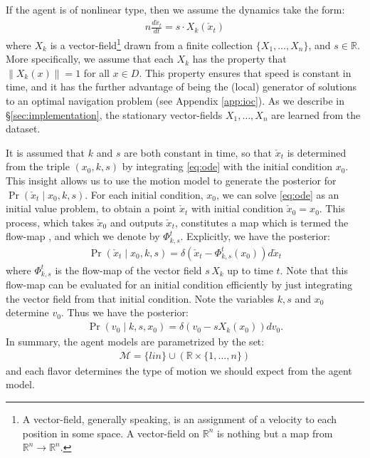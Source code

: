\documentclass[letterpaper,10pt,conference]{ieeeconf}
\begin{document}
If the agent is of nonlinear type, then we assume the dynamics take the form:
\begin{align}n
	\frac{d \check{x}_t}{dt} = s \cdot X_k(\check{x}_t) \label{eq:ode}
\end{align}
where $X_k$ is a vector-field\footnote{A vector-field, generally speaking, is an assignment of a velocity to each position in some space.  A vector-field on $\mathbb{R}^n$ is nothing but a map from $\mathbb{R}^n \to \mathbb{R}^n$.} drawn from a finite collection $\{X_1, \dots, X_n\}$, and $s \in \mathbb{R}$.
More specifically, we assume that each $X_k$ has the property that $\| X_k(x) \| = 1$ for all $x \in D$.
This property ensures that speed is constant in time, and it has the further advantage of being the (local) generator
of solutions to an optimal navigation problem (see Appendix \ref{app:ioc}).
As we describe in \S \ref{sec:implementation}, the stationary vector-fields $X_1,\dots,X_n$ are learned from the dataset.

It is assumed that $k$ and $s$ are both constant in time, so that $\check{x}_t$ is determined from the triple $(x_0,k,s)$ by integrating \eqref{eq:ode} with the initial condition $x_0$.
This insight allows us to use the motion model to generate the posterior for $\Pr( \check{x}_t \mid x_0, k, s)$.
For each initial condition, $x_0$, we can solve \eqref{eq:ode} as an initial value problem, to obtain a point $\check{x}_t$ with initial condition $\check{x}_0 = x_0$.
This process, which takes $\check{x}_0$ and outputs $\check{x}_t$, constitutes a map which is termed the flow-map \cite[Ch 4]{MTA}, and which we denote by $\Phi_{k,s}^t$.
Explicitly, we have the posterior:
\begin{align}
	\Pr( \check{x}_t \mid x_0 , k , s) = \delta( \check{x}_t - \Phi^{t}_{k,s}( x_0) )  d\check{x}_t \label{eq:x_check | ksx}
\end{align}
where $\Phi^{t}_{k,s}$ is the flow-map of the vector field $s \,X_k$ up to time $t$.
Note that this flow-map can be evaluated for an initial condition efficiently by just integrating the vector field from that initial condition.
Note the variables $k,s$ and $x_0$ determine $v_0$.
Thus we have the posterior:
\begin{align}
	\Pr( v_0 \mid k, s, x_0) = \delta( v_0 -s X_k( x_0) ) dv_0. \label{eq:v | ksx}
\end{align}
In summary, the agent models are parametrized by the set:
\begin{align}
	\mathcal{M} = \{ lin \} \cup \left( \mathbb{R} \times \{ 1 , \dots, n \} \right) \label{eq:models}
\end{align}
and each flavor determines the type of motion we should expect from the agent model.
\end{document}
